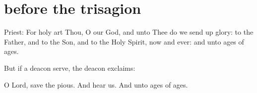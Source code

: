 \section{before the trisagion}

\begin{liturgicaltext}
    \priest Priest: For holy art Thou, O our God, and unto Thee do we send up glory: to the Father, and to the Son, and to the Holy Spirit, now and ever: \linebreak {} and unto ages of ages.
\end{liturgicaltext}

\begin{rubricsection}

\begin{rubricmed}
    But if a deacon serve, the deacon exclaims:
\end{rubricmed}

\begin{liturgicaltext}
    \deacon O Lord, save the pious.
    \choir {}
    \deacon And hear us.
    \choir {}
    \deacon And unto ages of ages.
\end{liturgicaltext}

\end{rubricsection}